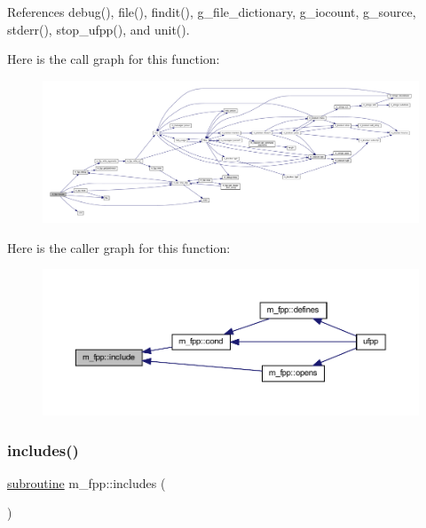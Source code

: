 References debug(), file(), findit(), g\+\_\+file\+\_\+dictionary, g\+\_\+iocount, g\+\_\+source, stderr(), stop\+\_\+ufpp(), and unit().

Here is the call graph for this function\+:
\nopagebreak
\begin{figure}[H]
\begin{center}
\leavevmode
\includegraphics[width=350pt]{namespacem__fpp_ae2b0d4bedb5c55788d054fefdef54fcc_cgraph}
\end{center}
\end{figure}
Here is the caller graph for this function\+:
\nopagebreak
\begin{figure}[H]
\begin{center}
\leavevmode
\includegraphics[width=350pt]{namespacem__fpp_ae2b0d4bedb5c55788d054fefdef54fcc_icgraph}
\end{center}
\end{figure}
\mbox{\label{namespacem__fpp_ae2377b0a62c6cfcf80593df3126cd45f}} 
\subsubsection{\texorpdfstring{includes()}{includes()}}
{\footnotesize\ttfamily \hyperlink{M__stopwatch_83_8txt_acfbcff50169d691ff02d4a123ed70482}{subroutine} m\+\_\+fpp\+::includes (\begin{DoxyParamCaption}{ }\end{DoxyParamCaption})}



